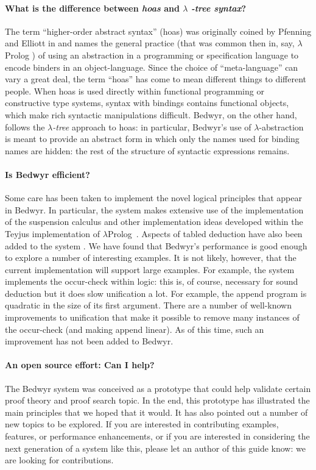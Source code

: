 \documentclass{article}
\newcommand{\lp}{$\lambda$Prolog}
\begin{document}
\paragraph{What is the difference between {\em hoas} and $\lambda${\em
    -tree syntax}?}
The term ``higher-order abstract syntax'' (hoas) was originally coined
by Pfenning and Elliott in \cite{pfenning88pldi} and names the general
practice (that was common then in, say, $\lambda$Prolog
\cite{miller87slp}) of using an abstraction in a programming or
specification language to encode binders in an object-language.  Since
the choice of ``meta-language'' can vary a great deal, the term
``hoas'' has come to mean different things to different people.  When
hoas is used directly within functional programming or constructive
type systems, syntax with bindings contains functional objects, which
make rich syntactic manipulations difficult.  Bedwyr, on the other
hand, follows the {\em $\lambda$-tree} approach \cite{miller00cl} to
hoas: in particular, Bedwyr's use of $\lambda$-abstraction is meant to
provide an abstract form in which only the names used for binding
names are hidden: the rest of the structure of syntactic expressions
remains.

\paragraph{Is Bedwyr efficient?}
Some care has been taken to implement the novel logical principles
that appear in Bedwyr.  In particular, the system makes extensive use
of the implementation of the suspension calculus \cite{nadathur99jflp}
and other implementation ideas developed within the Teyjus
\cite{nadathur99cade} implementation of \lp\ \cite{nadathur88iclp}.
Aspects of tabled deduction have also been added to the system
\cite{ramakrishna97cav,pientka05cade}.  We have found that Bedwyr's
performance is good enough to explore a number of interesting
examples.  It is not likely, however, that the current implementation
will support large examples.  For example, the system implements the
occur-check within logic: this is, of course, necessary for sound
deduction but it does slow unification a lot.  For example, the append
program is quadratic in the size of its first argument.  There are a
number of well-known improvements to unification that make it possible
to remove many instances of the occur-check (and making append
linear).  As of this time, such an improvement has not been added to
Bedwyr.  

\paragraph{An open source effort: Can I help?}
The Bedwyr system was conceived as a prototype that could help
validate certain proof theory and proof search topic.  In the end,
this prototype has illustrated the main principles that we hoped that
it would.  It has also pointed out a number of new topics to be
explored.  If you are interested in contributing examples, features,
or performance enhancements, or if you are interested in considering
the next generation of a system like this, please let an author of
this guide know: we are looking for contributions.
\end{document}
